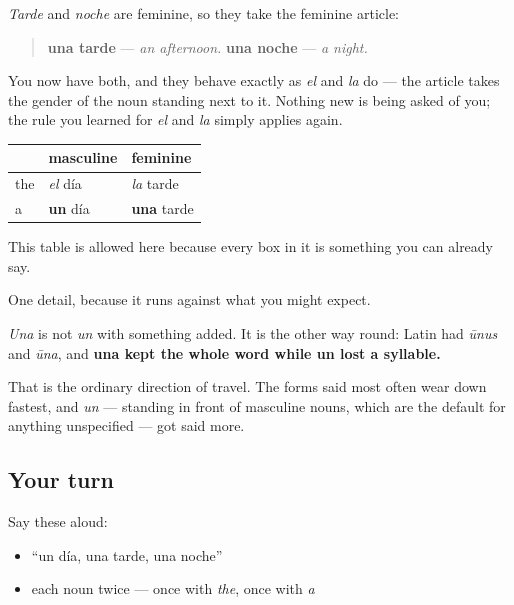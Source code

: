 \begin{grammarlens}[title={Grammar Lens: the partner}]
\emph{Tarde} and \emph{noche} are feminine, so they take the feminine article:

\begin{quote}
\textbf{una tarde} — \emph{an afternoon.} \textbf{una noche} — \emph{a night.}
\end{quote}

You now have both, and they behave exactly as \emph{el} and \emph{la} do — the article takes the gender of the noun standing next to it. Nothing new is being asked of you; the rule you learned for \emph{el} and \emph{la} simply applies again.

\noindent
\begin{tabularx}{\linewidth}{@{}>{\raggedright\arraybackslash}X>{\raggedright\arraybackslash}X>{\raggedright\arraybackslash}X@{}}
\toprule
\textbf{} & \textbf{masculine} & \textbf{feminine} \\
\midrule
the & \emph{el} día & \emph{la} tarde \\
a & \textbf{un} día & \textbf{una} tarde \\
\bottomrule
\end{tabularx}

This table is allowed here because every box in it is something you can already say.
\end{grammarlens}

\begin{cousinweb}
One detail, because it runs against what you might expect.

\emph{Una} is not \emph{un} with something added. It is the other way round: Latin had \emph{ūnus} and \emph{ūna}, and \textbf{una kept the whole word while un lost a syllable.}

That is the ordinary direction of travel. The forms said most often wear down fastest, and \emph{un} — standing in front of masculine nouns, which are the default for anything unspecified — got said more.
\end{cousinweb}

\subsection*{Your turn}
Say these aloud:

\begin{itemize}
\raggedright
  \item \textquotedblleft{}un día, una tarde, una noche\textquotedblright{}
  \item each noun twice — once with \emph{the}, once with \emph{a}
\end{itemize}

